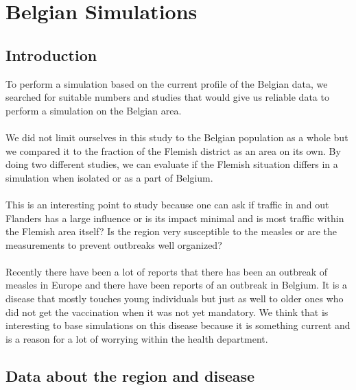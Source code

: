 \documentclass[runningheads]{llncs}
\begin{document}
	\newpage
	
	\section{Belgian Simulations}
	\subsection{Introduction}
	To perform a simulation based on the current profile of the Belgian data, we searched for suitable numbers and studies that would give us reliable data to perform a simulation on the Belgian area.\\
	\\
	We did not limit ourselves in this study to the Belgian population as a whole but we compared it to the fraction of the Flemish district as an area on its own.
	By doing two different studies, we can evaluate if the Flemish situation differs in a simulation when isolated or as a part of Belgium.\\
	\noindent\\
	This is an interesting point to study because one can ask if traffic in and out Flanders has a large influence or is its impact minimal and is most traffic within the Flemish area itself? Is the region very susceptible to the measles or are the measurements to prevent outbreaks well organized?\\
	\noindent\\
	Recently there have been a lot of reports that there has been an outbreak of measles in Europe and there have been reports of an outbreak in Belgium. It is a disease that mostly touches young individuals but just as well to older ones who did not get the vaccination when it was not yet mandatory. We think that is interesting to base simulations on this disease because it is something current and is a reason for a lot of worrying within the health department.
	
	\subsection{Data about the region and disease}
	
\end{document}

